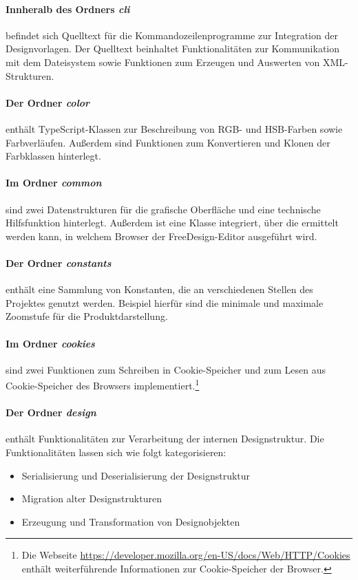 \paragraph{Innheralb des Ordners \emph{cli}} befindet sich Quelltext für die Kommandozeilenprogramme zur Integration der Designvorlagen.  
Der Quelltext beinhaltet Funktionalitäten zur Kommunikation mit dem Dateisystem sowie Funktionen zum Erzeugen und Auswerten von XML-Strukturen.

\paragraph{Der Ordner \emph{color}} enthält TypeScript-Klassen zur Beschreibung von RGB- und HSB-Farben sowie Farbverläufen. Außerdem sind Funktionen zum Konvertieren und Klonen der Farbklassen hinterlegt. 

\paragraph{Im Ordner \emph{common}} sind zwei Datenstrukturen für die grafische Oberfläche und eine technische Hilfsfunktion hinterlegt. Außerdem ist eine Klasse integriert, über die ermittelt werden kann, in welchem Browser der FreeDesign-Editor ausgeführt wird.

\paragraph{Der Ordner \emph{constants}} enthält eine Sammlung von Konstanten, die an verschiedenen Stellen des Projektes genutzt werden. Beispiel hierfür sind die minimale und maximale Zoomstufe für die Produktdarstellung. 

\paragraph{Im Ordner \emph{cookies}} sind zwei Funktionen zum Schreiben in Cookie-Speicher und zum Lesen aus Cookie-Speicher des Browsers implementiert.\footnote{Die Webseite \url{https://developer.mozilla.org/en-US/docs/Web/HTTP/Cookies} enthält weiterführende Informationen zur Cookie-Speicher der Browser.}  

\paragraph{Der Ordner \emph{design}} enthält Funktionalitäten zur Verarbeitung der internen Designstruktur.
Die Funktionalitäten lassen sich wie folgt kategorisieren:
\begin{itemize}
    \item Serialisierung und Deserialisierung der Designstruktur
    \item Migration alter Designstrukturen
    \item Erzeugung und Transformation von Designobjekten
\end{itemize}

